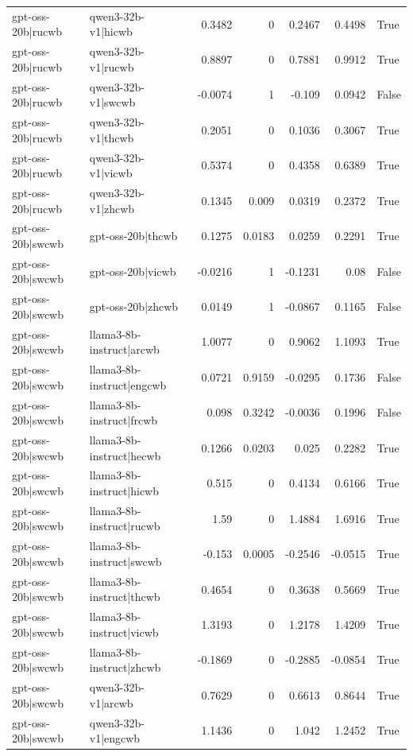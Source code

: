 \begin{table}
\begin{tabular}{l l r r r r l}
gpt-oss-20b|rucwb & qwen3-32b-v1|hicwb & 0.3482 & 0 & 0.2467 & 0.4498 & True \\
gpt-oss-20b|rucwb & qwen3-32b-v1|rucwb & 0.8897 & 0 & 0.7881 & 0.9912 & True \\
gpt-oss-20b|rucwb & qwen3-32b-v1|swcwb & -0.0074 & 1 & -0.109 & 0.0942 & False \\
gpt-oss-20b|rucwb & qwen3-32b-v1|thcwb & 0.2051 & 0 & 0.1036 & 0.3067 & True \\
gpt-oss-20b|rucwb & qwen3-32b-v1|vicwb & 0.5374 & 0 & 0.4358 & 0.6389 & True \\
gpt-oss-20b|rucwb & qwen3-32b-v1|zhcwb & 0.1345 & 0.009 & 0.0319 & 0.2372 & True \\
gpt-oss-20b|swcwb & gpt-oss-20b|thcwb & 0.1275 & 0.0183 & 0.0259 & 0.2291 & True \\
gpt-oss-20b|swcwb & gpt-oss-20b|vicwb & -0.0216 & 1 & -0.1231 & 0.08 & False \\
gpt-oss-20b|swcwb & gpt-oss-20b|zhcwb & 0.0149 & 1 & -0.0867 & 0.1165 & False \\
gpt-oss-20b|swcwb & llama3-8b-instruct|arcwb & 1.0077 & 0 & 0.9062 & 1.1093 & True \\
gpt-oss-20b|swcwb & llama3-8b-instruct|engcwb & 0.0721 & 0.9159 & -0.0295 & 0.1736 & False \\
gpt-oss-20b|swcwb & llama3-8b-instruct|frcwb & 0.098 & 0.3242 & -0.0036 & 0.1996 & False \\
gpt-oss-20b|swcwb & llama3-8b-instruct|hecwb & 0.1266 & 0.0203 & 0.025 & 0.2282 & True \\
gpt-oss-20b|swcwb & llama3-8b-instruct|hicwb & 0.515 & 0 & 0.4134 & 0.6166 & True \\
gpt-oss-20b|swcwb & llama3-8b-instruct|rucwb & 1.59 & 0 & 1.4884 & 1.6916 & True \\
gpt-oss-20b|swcwb & llama3-8b-instruct|swcwb & -0.153 & 0.0005 & -0.2546 & -0.0515 & True \\
gpt-oss-20b|swcwb & llama3-8b-instruct|thcwb & 0.4654 & 0 & 0.3638 & 0.5669 & True \\
gpt-oss-20b|swcwb & llama3-8b-instruct|vicwb & 1.3193 & 0 & 1.2178 & 1.4209 & True \\
gpt-oss-20b|swcwb & llama3-8b-instruct|zhcwb & -0.1869 & 0 & -0.2885 & -0.0854 & True \\
gpt-oss-20b|swcwb & qwen3-32b-v1|arcwb & 0.7629 & 0 & 0.6613 & 0.8644 & True \\
gpt-oss-20b|swcwb & qwen3-32b-v1|engcwb & 1.1436 & 0 & 1.042 & 1.2452 & True \\

\end{tabular}
\end{table}
